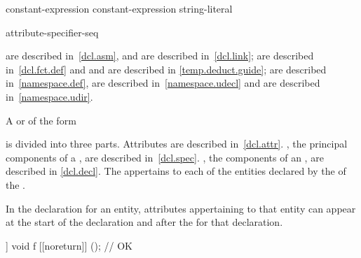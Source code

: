 \begin{bnf}
\br
   \terminal{(} constant-expression \terminal{)} \terminal{;}\br
   \terminal{(} constant-expression \terminal{,} string-literal \terminal{)} \terminal{;}
\end{bnf}

\begin{bnf}
\br
    \terminal{;}
\end{bnf}

\begin{bnf}
\br
    attribute-specifier-seq \terminal{;}
\end{bnf}

\begin{note}
 are described in~\ref{dcl.asm}, and
 are described in~\ref{dcl.link};
 are described in~\ref{dcl.fct.def} and
 and
 are described in \ref{temp.deduct.guide};
 are described in~\ref{namespace.def},
 are described in~\ref{namespace.udecl} and
 are described in~\ref{namespace.udir}.
\end{note}

\pnum
A
 or
 of the form
\begin{ncsimplebnf}
   \terminal{;}
\end{ncsimplebnf}
is divided into three parts.
Attributes are described in~\ref{dcl.attr}.
, the principal components of
a , are described in~\ref{dcl.spec}.
, the components of an
, are described in \ref{dcl.decl}.
The 
appertains to each of the entities declared by
the 
of the .
\begin{note}
In the declaration for an entity, attributes appertaining to that
entity can appear at the start of the declaration and after the
 for that declaration.
\end{note}
\begin{example}
\begin{codeblock}
[[noreturn]] void f [[noreturn]] ();    // OK
\end{codeblock}
\end{example}

